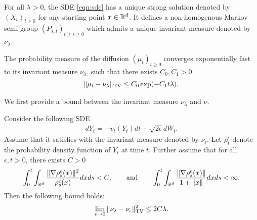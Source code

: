 \begin{assumption}
\label{asmp:sde_ergo}
For all $\lambda >0$, the SDE  \eqref{eqn:sde} has a unique strong solution denoted by $(X_t)_{t\geq 0}$ for any starting point $x \in \mathbb{R}^d$. It defines a non-homogenous Markov semi-group $(P_{s,t})_{t\geq s\geq 0}$ which admits a unique invariant measure denoted by $\nu_\lambda$. 
\end{assumption}

\begin{assumption}
\label{asmp:sde_expconv}
The probability measure of the diffusion $(\mu_t)_{t\geq 0}$ converges exponentially fast to its invariant measure $\nu_\lambda$, such that there exists $C_0, C_1 >0$
\begin{align}
\|\mu_t - \nu_\lambda \|_{\textnormal{TV}} \leq C_0 \exp(-C_1 t \lambda).
\end{align}
\end{assumption}

We first provide a bound between the invariant measure $\nu_\lambda$ and $\nu$.

\begin{prop}
\label{prop:dist_statmeas}
Consider the following SDE
\begin{align}
d Y_t = - v_t(Y_t) dt + \sqrt{2 \epsilon } d W_t. \label{eqn:sde_eps}
\end{align}
Assume that it satisfies  with the invariant measure denoted by $\nu_\epsilon$. Let $\rho^\epsilon_t$ denote the probability density function of $Y_t$ at time $t$. Further assume that for all $\epsilon,t>0$, there exists $C >0$  
\begin{align}
\int_{0}^t \int_{\mathbb{R}^d} \frac{\|\nabla \rho^\epsilon_s(x) \|^2}{\rho^\epsilon_s(x)} dx ds <C, \qquad \text{and} \qquad \int_{0}^t \int_{\mathbb{R}^d}  \frac{\|\nabla \rho^\epsilon_s(x)\|}{1+\|x\|} dx ds <\infty.
\end{align}
Then the following bound holds:
\begin{align}
\lim_{\epsilon \rightarrow 0} \| \nu_\lambda - \nu_\epsilon \|_{\textnormal{TV}}^2 \leq 2 C \lambda.
\end{align}
\end{prop}
